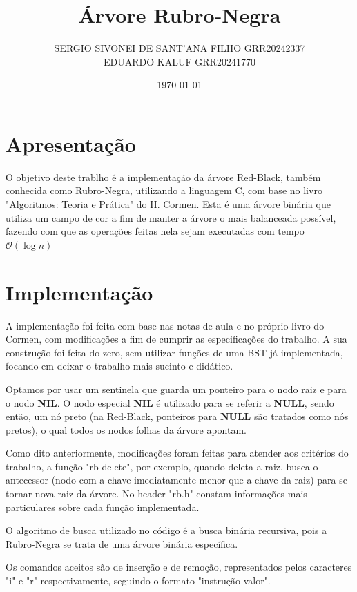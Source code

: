 \documentclass{article}  %
\title{Árvore Rubro-Negra}
\author{SERGIO SIVONEI DE SANT'ANA FILHO GRR20242337\\EDUARDO KALUF GRR20241770}
\date{\today}
\begin{document}
    \maketitle
    
    \section{Apresentação}
    
    \setlength{\parindent}{15pt}

    O objetivo deste trablho é a implementação da árvore Red-Black, também conhecida como Rubro-Negra, utilizando a linguagem C, com base no livro \href{https://computerscience360.wordpress.com/wp-content/uploads/2018/02/algoritmos-teoria-e-prc3a1tica-3ed-thomas-cormen.pdf}{"Algoritmos: Teoria e Prática"} do H. Cormen.
    Esta é uma árvore binária que utiliza um campo de cor a fim de manter a árvore o mais balanceada possível, fazendo com que as operações feitas nela sejam executadas com tempo $\mathcal{O}(\log n)$

    \section{Implementação}

    A implementação foi feita com base nas notas de aula e no próprio livro do Cormen, com modificações a fim de cumprir as especificações do trabalho. A sua construção foi feita do zero, sem utilizar funções de uma BST já implementada, focando em deixar o trabalho mais sucinto e didático.

    Optamos por usar um sentinela que guarda um ponteiro para o nodo raiz e para o nodo \textbf{NIL}. O nodo especial \textbf{NIL} é utilizado para se referir a \textbf{NULL}, sendo então, um nó preto (na Red-Black, ponteiros para \textbf{NULL} são tratados como nós pretos), o qual todos os nodos folhas da árvore apontam.

    Como dito anteriormente, modificações foram feitas para atender aos critérios do trabalho, a função "rb delete", por exemplo, quando deleta a raiz, busca o antecessor (nodo com a chave imediatamente menor que a chave da raiz) para se tornar nova raiz da árvore. No header "rb.h" constam informações mais particulares sobre cada função implementada.

    O algoritmo de busca utilizado no código é a busca binária recursiva, pois a Rubro-Negra se trata de uma árvore binária específica.

    Os comandos aceitos são de inserção e de remoção, representados pelos caracteres "i" e "r" respectivamente, seguindo o formato "instrução valor". 
    \enlargethispage{2\baselineskip}
\end{document}

